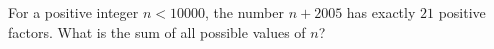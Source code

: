 For a positive integer $n<10000$, the number $n+2005$ has exactly $21$ positive factors. What is the sum of all possible values of $n$?
